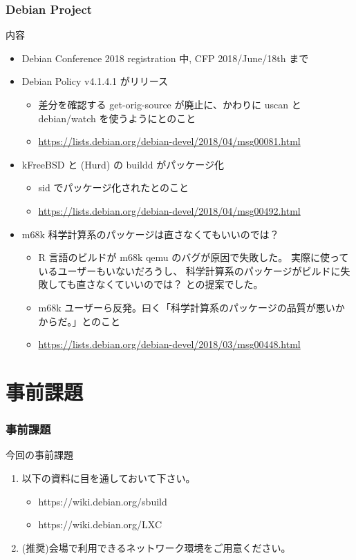 \documentclass[cjk,dvipdfmx,10pt,compress,%
hyperref={bookmarks=true,bookmarksnumbered=true,bookmarksopen=false,%
colorlinks=false,%
pdftitle={第 132 回 関西 Debian 勉強会},%
pdfauthor={かわだ},%
pdfsubject={資料},%
}]{beamer}
\begin{document}
\begin{frame}[fragile]
  \frametitle{Debian Project}
  \begin{block}{内容}
  \begin{itemize}
	\item Debian Conference 2018 registration 中, CFP 2018/June/18th まで
	\item Debian Policy v4.1.4.1 がリリース
  		\begin{itemize}
		\item 差分を確認する get-orig-source が廃止に、かわりに uscan と debian/watch を使うようにとのこと
		\item \url{https://lists.debian.org/debian-devel/2018/04/msg00081.html}
  		\end{itemize}
	\item kFreeBSD と (Hurd) の buildd がパッケージ化
		\begin{itemize}
			\item sid でパッケージ化されたとのこと
			\item \url{https://lists.debian.org/debian-devel/2018/04/msg00492.html}
  		\end{itemize}
	\item m68k 科学計算系のパッケージは直さなくてもいいのでは？ 
		\begin{itemize}
			\item R 言語のビルドが m68k qemu のバグが原因で失敗した。	実際に使っているユーザーもいないだろうし、	科学計算系のパッケージがビルドに失敗しても直さなくていいのでは？ との提案でした。
			\item m68k ユーザーら反発。曰く「科学計算系のパッケージの品質が悪いかからだ。」とのこと
			\item \url{https://lists.debian.org/debian-devel/2018/03/msg00448.html}
		\end{itemize}
	\end{itemize}
  \end{block}
\end{frame}


\section{事前課題}

\begin{frame}[fragile]
  \frametitle{事前課題}
  \begin{block}{今回の事前課題}
    \begin{enumerate}
	\item 以下の資料に目を通しておいて下さい。
	\begin{itemize}
		\item https://wiki.debian.org/sbuild
		\item https://wiki.debian.org/LXC
	\end{itemize}
	\item (推奨)会場で利用できるネットワーク環境をご用意ください。
    \end{enumerate}
  \end{block}
\end{frame}
\end{document}

